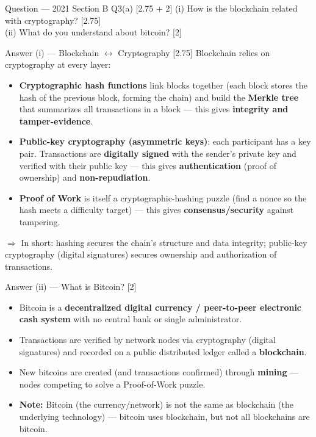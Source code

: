 \documentclass[12pt,a4paper]{article}
\begin{document}
\begin{qbox}{Question --- 2021 Section B Q3(a) [2.75 + 2]}
(i) How is the blockchain related with cryptography? [2.75]\\
(ii) What do you understand about bitcoin? [2]
\end{qbox}

\begin{solbox}{Answer (i) --- Blockchain $\leftrightarrow$ Cryptography [2.75]}
Blockchain relies on cryptography at every layer:
\begin{itemize}[noitemsep]
  \item \textbf{Cryptographic hash functions} link blocks together (each block stores the hash of the previous block, forming the chain) and build the \textbf{Merkle tree} that summarizes all transactions in a block --- this gives \textbf{integrity and tamper-evidence}.
  \item \textbf{Public-key cryptography (asymmetric keys)}: each participant has a key pair. Transactions are \textbf{digitally signed} with the sender's private key and verified with their public key --- this gives \textbf{authentication} (proof of ownership) and \textbf{non-repudiation}.
  \item \textbf{Proof of Work} is itself a cryptographic-hashing puzzle (find a nonce so the hash meets a difficulty target) --- this gives \textbf{consensus/security} against tampering.
\end{itemize}
$\Rightarrow$ In short: hashing secures the chain's structure and data integrity; public-key cryptography (digital signatures) secures ownership and authorization of transactions.
\end{solbox}

\begin{solbox}{Answer (ii) --- What is Bitcoin? [2]}
\begin{itemize}[noitemsep]
  \item Bitcoin is a \textbf{decentralized digital currency / peer-to-peer electronic cash system} with no central bank or single administrator.
  \item Transactions are verified by network nodes via cryptography (digital signatures) and recorded on a public distributed ledger called a \textbf{blockchain}.
  \item New bitcoins are created (and transactions confirmed) through \textbf{mining} --- nodes competing to solve a Proof-of-Work puzzle.
  \item \textbf{Note:} Bitcoin (the currency/network) is not the same as blockchain (the underlying technology) --- bitcoin uses blockchain, but not all blockchains are bitcoin.
\end{itemize}
\end{solbox}
\end{document}
